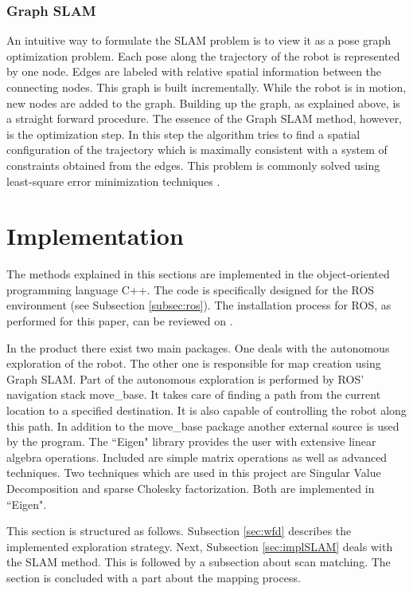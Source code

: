 \documentclass{ba-kecs}
\begin{document}
\subsubsection{Graph SLAM}
An intuitive way to formulate the SLAM problem is to view it as a pose graph optimization problem. Each pose along the trajectory of the robot is represented by one node. Edges are labeled with relative spatial information between the connecting nodes. This graph is built incrementally. While the robot is in motion, new nodes are added to the graph. Building up the graph, as explained above, is a straight forward procedure. The essence of the Graph SLAM method, however, is the optimization step. In this step the algorithm tries to find a spatial configuration of the trajectory which is maximally consistent with a system of constraints obtained from the edges. This problem is commonly solved using least-square error minimization techniques \citep{Grisetti}.

\section{Implementation}
\label{sec:impl}

The methods explained in this sections are implemented in the object-oriented programming language C++. The code is specifically designed for the ROS environment (see Subsection \ref{subsec:ros}). The installation process for ROS, as performed for this paper, can be reviewed on \cite{swarmlab}.

In the product there exist two main packages. One deals with the autonomous exploration of the robot. The other one is responsible for map creation using Graph SLAM. Part of the autonomous exploration is performed by ROS' navigation stack move\_base. It takes care of finding a path from the current location to a specified destination. It is also capable of controlling the robot along this path. In addition to the move\_base package another external source is used by the program. The ``Eigen" library \citep{eigen} provides the user with extensive linear algebra operations. Included are simple matrix operations as well as advanced techniques. Two techniques which are used in this project are Singular Value Decomposition and sparse Cholesky factorization. Both are implemented in ``Eigen".

This section is structured as follows. Subsection \ref{sec:wfd} describes the implemented exploration strategy. Next, Subsection \ref{sec:implSLAM} deals with the SLAM method. This is followed by a subsection about scan matching. The section is concluded with a part about the mapping process. 
\end{document}
